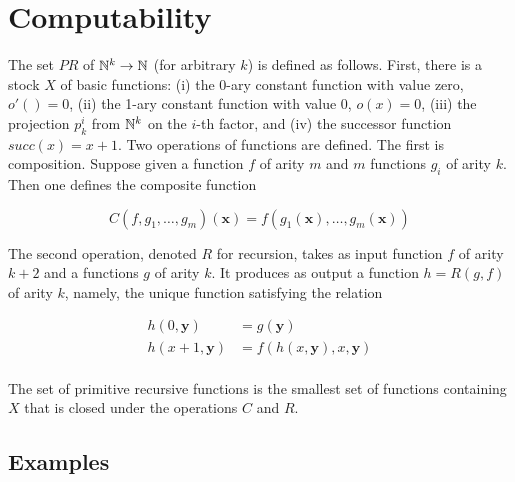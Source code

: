 

\begin{mathmacro}
\newcommand{\nat}[0]{\mathbb{N}}
\end{mathmacro}

\section{Computability}

The set $PR$ of  $\nat^k \to \nat$ (for arbitrary $k$) is defined as follows.  First, there is a stock $X$ of basic functions: (i) the 0-ary constant function with value zero, $o'() = 0$, (ii) the 1-ary constant function with value 0, $o(x) = 0$, (iii) the projection $p^i_k$ from $\nat^k$ on the $i$-th factor, and (iv) the successor function $succ(x) = x + 1$.  Two operations of functions are defined. The first is composition.  Suppose given a function $f$ of arity $m$ and $m$ functions $g_i$ of arity $k$.  Then one defines the composite function


\begin{equation}
C(f,g_1,\ldots,g_m)(\boldsymbol{x}) = f(g_1(\boldsymbol{x}), \ldots, g_m(\boldsymbol{x}))
\end{equation}

The second operation, denoted $R$ for recursion, takes as input  function $f$ of arity $k+2$ and a functions $g$ of arity $k$.  It produces as output a function $h = R(g,f)$ of arity $k$, namely, the unique function satisfying the relation

\begin{align}
  h(0, \boldsymbol{y}) &= g(\boldsymbol{y}) \\
  h(x + 1, \boldsymbol{y}) &= f(h(x,\boldsymbol{y}), x, \boldsymbol{y}) \\
\end{align}

\begin{definition}
The set of primitive recursive functions is the smallest set of functions containing $X$ that is closed under the operations $C$ and $R$.
\end{definition}

\subsection{Examples}


